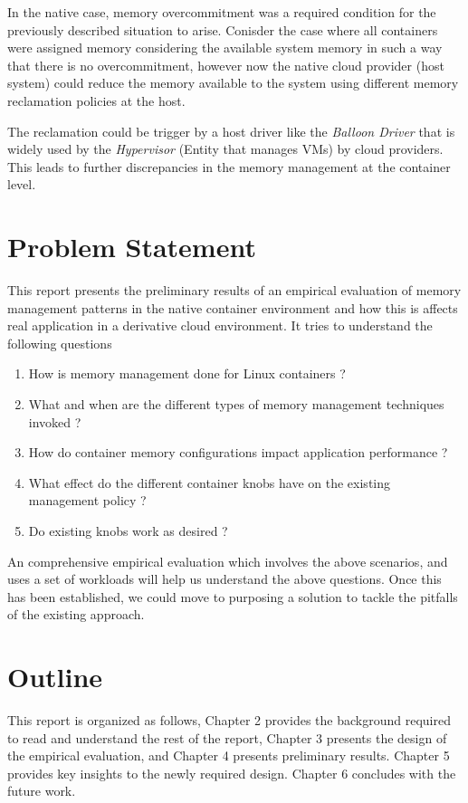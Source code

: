      In the native case, memory overcommitment was a required condition for the previously described situation to arise. Conisder the case 
where all containers were assigned memory considering the available system memory in such a way that there is no overcommitment, however 
now the native cloud provider (host system) could reduce the memory available to the system using different memory reclamation policies at 
the host. 

      The reclamation could be trigger by a host driver like the \textit{Balloon Driver} that is widely used by the \textit{Hypervisor} 
(Entity that manages VMs) by cloud providers. This leads to further discrepancies in the memory management at the container level. 
  
  \pagebreak
  
  \section{Problem Statement}
    
    This report presents the preliminary results of an empirical evaluation of memory management patterns in the native container 
environment and how this is affects real application in a derivative cloud environment. It tries to understand the following questions

    \begin{enumerate}
      \item How is memory management done for Linux containers ?
      \item What and when are the different types of memory management techniques invoked ?
      \item How do container memory configurations impact application performance ?
      \item What effect do the different container knobs have on the existing management policy ?
      \item Do existing knobs work as desired ?
    \end{enumerate}
    
    An comprehensive empirical evaluation which involves the above scenarios, and uses a set of workloads will help us understand the above 
questions. Once this has been established, we could move to purposing a solution to tackle the pitfalls of the existing approach.

  \section{Outline}
  
    This report is organized as follows, Chapter 2 provides the background required to read and understand the rest of the report, Chapter 
3 presents the design of the empirical evaluation, and Chapter 4 presents preliminary results.  Chapter 5 provides key insights to the 
newly required design. Chapter 6 concludes with the future work.

  